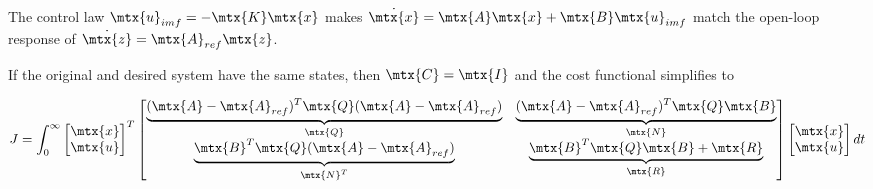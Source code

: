 The control law $\mtx{u}_{imf} = -\mtx{K}\mtx{x}$ makes
$\dot{\mtx{x}} = \mtx{A}\mtx{x} + \mtx{B}\mtx{u}_{imf}$ match the open-loop
response of $\dot{\mtx{z}} = \mtx{A}_{ref}\mtx{z}$.

If the original and desired system have the same states, then
$\mtx{C} = \mtx{I}$ and the cost functional simplifies to

\begin{equation}
  J = \int_0^\infty
  \begin{bmatrix}
    \mtx{x} \\
    \mtx{u}
  \end{bmatrix}^T
  \begin{bmatrix}
    \underbrace{(\mtx{A} - \mtx{A}_{ref})^T\mtx{Q}
      (\mtx{A} - \mtx{A}_{ref})}_{\mtx{Q}} &
    \underbrace{(\mtx{A} - \mtx{A}_{ref})^T\mtx{Q}\mtx{B}}_{\mtx{N}} \\
    \underbrace{\mtx{B}^T\mtx{Q}(\mtx{A} - \mtx{A}_{ref})}_{\mtx{N}^T} &
    \underbrace{\mtx{B}^T\mtx{Q}\mtx{B} + \mtx{R}}_{\mtx{R}}
  \end{bmatrix}
  \begin{bmatrix}
    \mtx{x} \\
    \mtx{u}
  \end{bmatrix}
  dt
\end{equation}

